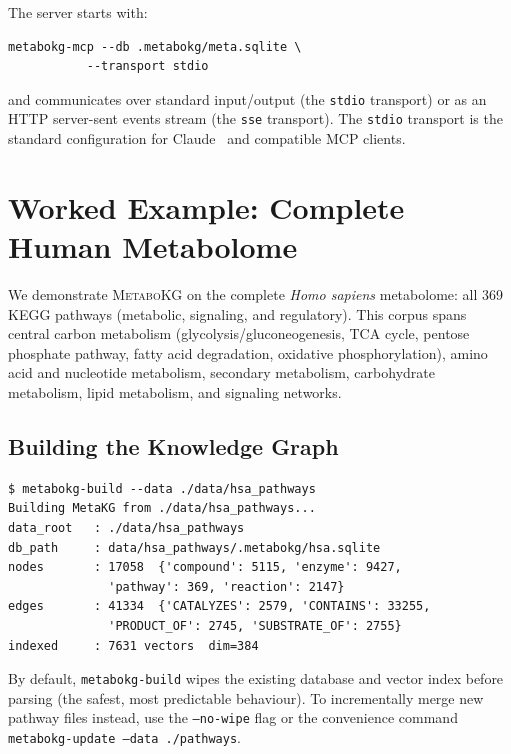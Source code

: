 \documentclass[10pt]{article}
\begin{document}
The server starts with:

\begin{lstlisting}[style=bash]
metabokg-mcp --db .metabokg/meta.sqlite \
           --transport stdio
\end{lstlisting}

\noindent and communicates over standard input/output (the \texttt{stdio}
transport) or as an HTTP server-sent events stream (the \texttt{sse}
transport). The \texttt{stdio} transport is the standard configuration for
Claude~\citep{anthropic2024claude} and compatible MCP clients.

\section{Worked Example: Complete Human Metabolome}
\label{sec:usage}

We demonstrate \textsc{MetaboKG} on the complete \textit{Homo sapiens}
metabolome: all 369 KEGG pathways (metabolic, signaling, and regulatory).
This corpus spans central carbon metabolism (glycolysis/gluconeogenesis, TCA
cycle, pentose phosphate pathway, fatty acid degradation, oxidative
phosphorylation), amino acid and nucleotide metabolism, secondary metabolism,
carbohydrate metabolism, lipid metabolism, and signaling networks.

\subsection{Building the Knowledge Graph}

\begin{lstlisting}[style=bash, caption={Building the complete human metabolome knowledge graph.}]
$ metabokg-build --data ./data/hsa_pathways
Building MetaKG from ./data/hsa_pathways...
data_root   : ./data/hsa_pathways
db_path     : data/hsa_pathways/.metabokg/hsa.sqlite
nodes       : 17058  {'compound': 5115, 'enzyme': 9427,
              'pathway': 369, 'reaction': 2147}
edges       : 41334  {'CATALYZES': 2579, 'CONTAINS': 33255,
              'PRODUCT_OF': 2745, 'SUBSTRATE_OF': 2755}
indexed     : 7631 vectors  dim=384
\end{lstlisting}

By default, \texttt{metabokg-build} wipes the existing database and vector index
before parsing (the safest, most predictable behaviour). To incrementally merge
new pathway files instead, use the \texttt{--no-wipe} flag or the convenience
command \texttt{metabokg-update --data ./pathways}.
\end{document}
